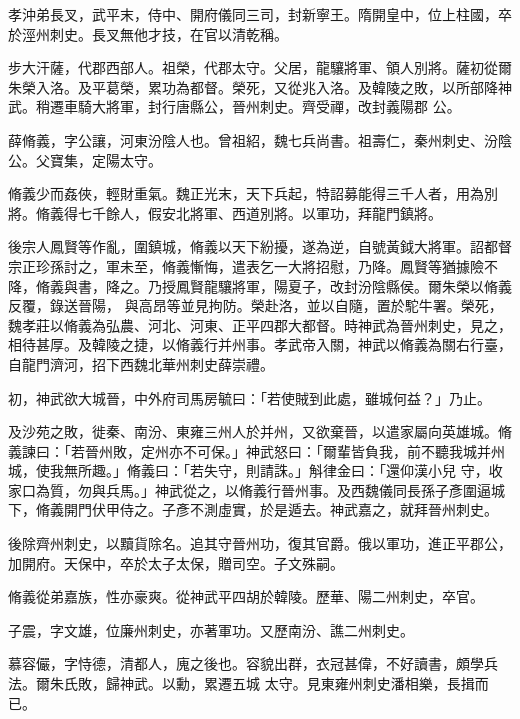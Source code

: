 \begin{pinyinscope}
 孝沖弟長叉，武平末，侍中、開府儀同三司，封新寧王。隋開皇中，位上柱國，卒於涇州刺史。長叉無他才技，在官以清乾稱。



 步大汗薩，代郡西部人。祖榮，代郡太守。父居，龍驤將軍、領人別將。薩初從爾朱榮入洛。及平葛榮，累功為都督。榮死，又從兆入洛。及韓陵之敗，以所部降神武。稍遷車騎大將軍，封行唐縣公，晉州刺史。齊受禪，改封義陽郡
 公。



 薛脩義，字公讓，河東汾陰人也。曾祖紹，魏七兵尚書。祖壽仁，秦州刺史、汾陰公。父寶集，定陽太守。



 脩義少而姦俠，輕財重氣。魏正光末，天下兵起，特詔募能得三千人者，用為別將。脩義得七千餘人，假安北將軍、西道別將。以軍功，拜龍門鎮將。



 後宗人鳳賢等作亂，圍鎮城，脩義以天下紛擾，遂為逆，自號黃鉞大將軍。詔都督宗正珍孫討之，軍未至，脩義慚悔，遣表乞一大將招慰，乃降。鳳賢等猶據險不降，脩義與書，降之。乃授鳳賢龍驤將軍，陽夏子，改封汾陰縣侯。爾朱榮以脩義反覆，錄送晉陽，
 與高昂等並見拘防。榮赴洛，並以自隨，置於駝牛署。榮死，魏孝莊以脩義為弘農、河北、河東、正平四郡大都督。時神武為晉州刺史，見之，相待甚厚。及韓陵之捷，以脩義行并州事。孝武帝入關，神武以脩義為關右行臺，自龍門濟河，招下西魏北華州刺史薛崇禮。



 初，神武欲大城晉，中外府司馬房毓曰：「若使賊到此處，雖城何益？」乃止。



 及沙苑之敗，徙秦、南汾、東雍三州人於并州，又欲棄晉，以遣家屬向英雄城。脩義諫曰：「若晉州敗，定州亦不可保。」神武怒曰：「爾輩皆負我，前不聽我城并州城，使我無所趣。」脩義曰：「若失守，則請誅。」斛律金曰：「還仰漢小兒
 守，收家口為質，勿與兵馬。」神武從之，以脩義行晉州事。及西魏儀同長孫子彥圍逼城下，脩義開門伏甲侍之。子彥不測虛實，於是遁去。神武嘉之，就拜晉州刺史。



 後除齊州刺史，以黷貨除名。追其守晉州功，復其官爵。俄以軍功，進正平郡公，加開府。天保中，卒於太子太保，贈司空。子文殊嗣。



 脩義從弟嘉族，性亦豪爽。從神武平四胡於韓陵。歷華、陽二州刺史，卒官。



 子震，字文雄，位廉州刺史，亦著軍功。又歷南汾、譙二州刺史。



 慕容儼，字恃德，清都人，廆之後也。容貌出群，衣冠甚偉，不好讀書，頗學兵法。爾朱氏敗，歸神武。以勳，累遷五城
 太守。見東雍州刺史潘相樂，長揖而已。




\end{pinyinscope}

